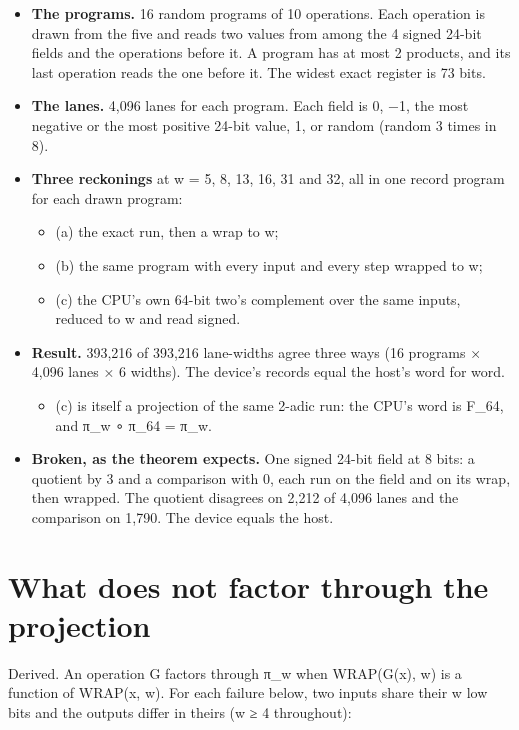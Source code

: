 \begin{itemize}
\item \textbf{The programs.} 16 random programs of 10 operations. Each operation is drawn from the five and reads two values from among the 4 signed 24-bit fields and the operations before it. A program has at most 2 products, and its last operation reads the one before it. The widest exact register is 73 bits.
\item \textbf{The lanes.} 4,096 lanes for each program. Each field is 0, −1, the most negative or the most positive 24-bit value, 1, or random (random 3 times in 8).
\item \textbf{Three reckonings} at w = 5, 8, 13, 16, 31 and 32, all in one record program for each drawn program:

\begin{itemize}
\item (a) the exact run, then a wrap to w;
\item (b) the same program with every input and every step wrapped to w;
\item (c) the CPU's own 64-bit two's complement over the same inputs, reduced to w and read signed.
\end{itemize}
\item \textbf{Result.} 393,216 of 393,216 lane-widths agree three ways (16 programs × 4,096 lanes × 6 widths). The device's records equal the host's word for word.

\begin{itemize}
\item (c) is itself a projection of the same 2-adic run: the CPU's word is F\_\allowbreak{}64, and π\_\allowbreak{}w ∘ π\_\allowbreak{}64 = π\_\allowbreak{}w.
\end{itemize}
\item \textbf{Broken, as the theorem expects.} One signed 24-bit field at 8 bits: a quotient by 3 and a comparison with 0, each run on the field and on its wrap, then wrapped. The quotient disagrees on 2,212 of 4,096 lanes and the comparison on 1,790. The device equals the host.
\end{itemize}

\section{\texorpdfstring{What does not factor through the projection}{What does not factor through the projection}}

Derived. An operation G factors through π\_\allowbreak{}w when WRAP(G(x), w) is a function of WRAP(x, w). For each failure below, two inputs share their w low bits and the outputs differ in theirs (w ≥ 4 throughout):

